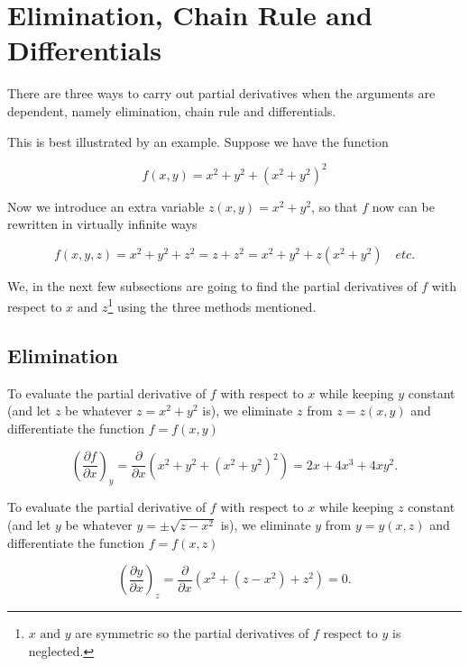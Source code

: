 \documentclass[english,a4paper,12pt]{report}
\begin{document}
\section{Elimination, Chain Rule and Differentials} \label{chain} 

There are three ways to carry out partial derivatives when the arguments are dependent, namely elimination, chain rule and differentials.

This is best illustrated by an example. Suppose we have the function

\begin{equation}
	f(x,y) = x^2+y^2+(x^2+y^2)^2
\end{equation}

Now we introduce an extra variable \(z(x,y) = x^2+y^2\), so that \(f\) now can be rewritten in virtually infinite ways

\begin{equation}
	f(x,y,z) = x^2+y^2+z^2 = z+z^2 = x^2+y^2+z(x^2+y^2) \quad \textit{etc.} 
\end{equation}

We, in the next few subsections are going to find the partial derivatives of \(f\) with respect to \(x \text { and }  z\)\footnote{\(x \text { and } y\) are symmetric so the partial derivatives of \(f\) respect to \(y\) is neglected.}  using the three methods mentioned. 

\subsection{Elimination}

To evaluate the partial derivative of \(f\) with respect to \(x\) while keeping \(y\) constant (and let \(z\) be whatever \(z = x^2+y^2\) is), we eliminate \(z\) from \(z = z(x,y)\) and differentiate the function \(f=f(x,y)\)  

\begin{equation}
	\left( \frac{\partial f}{\partial x}  \right)_{y} = \frac{\partial }{\partial x} (x^2+y^2+(x^2+y^2)^2) = 2x+4x^3 +4xy^2.  
\end{equation}

To evaluate the partial derivative of \(f\) with respect to \(x\) while keeping \(z\) constant (and let \(y\) be whatever \(y = \pm \sqrt{z-x^2} \) is), we eliminate \(y\) from \(y = y(x,z)\) and differentiate the function \(f=f(x,z)\) 

\begin{equation}
	\left( \frac{\partial y}{\partial x} \right)_{z} = \frac{\partial }{\partial x}(x^2+(z-x^2)+z^2) = 0.
\end{equation}
\end{document}
